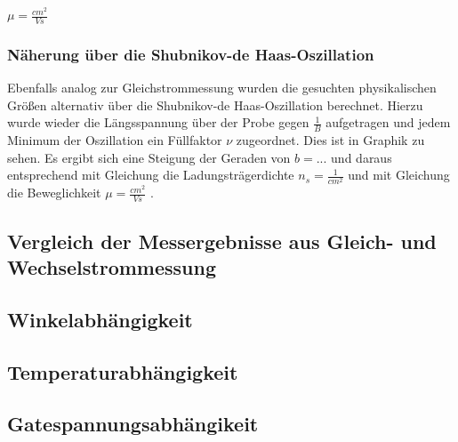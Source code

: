 $\mu= \frac{cm^2}{Vs}$  %


\subsubsection{Näherung über die Shubnikov-de Haas-Oszillation}
\label{über SDH-Oszillation}

Ebenfalls analog zur Gleichstrommessung wurden die gesuchten physikalischen Größen alternativ über die Shubnikov-de Haas-Oszillation berechnet. Hierzu wurde wieder die Längsspannung über der Probe 
gegen $\frac{1}{B}$ aufgetragen und jedem Minimum der Oszillation ein Füllfaktor $\nu$ zugeordnet. Dies ist in Graphik %
zu sehen. 
Es ergibt sich eine Steigung der Geraden von $b=...$  %
und daraus entsprechend mit Gleichung %
die Ladungsträgerdichte $n_s= \frac{1}{cm^2}$  %
und mit Gleichung %
die Beweglichkeit          
$\mu= \frac{cm^2}{Vs}$ . %



\subsection{Vergleich der Messergebnisse aus Gleich- und Wechselstrommessung}
\label{Vergleich der Messergebnisse}




\subsection{Winkelabhängigkeit}
\label{Winkelabhängigkeit}


\subsection{Temperaturabhängigkeit}
\label{Temperaturabhängigkeit}


\subsection{Gatespannungsabhängikeit}
\label{Gatespannungsabhängikeit}

